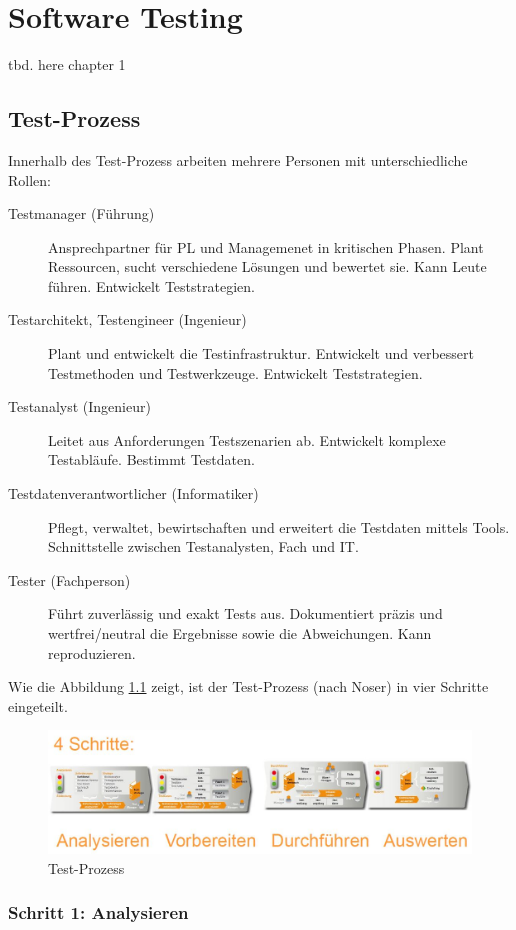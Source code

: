 \chapter{Software Testing}

tbd. here chapter 1

\section{Test-Prozess}

Innerhalb des Test-Prozess arbeiten mehrere Personen mit unterschiedliche Rollen:

\begin{description}
	\item[Testmanager (Führung)] Ansprechpartner für PL und Managemenet in kritischen Phasen. Plant Ressourcen, sucht verschiedene Lösungen und bewertet sie. Kann Leute führen. Entwickelt Teststrategien.
	\item[Testarchitekt, Testengineer (Ingenieur)] Plant und entwickelt die Testinfrastruktur. Entwickelt und verbessert Testmethoden und Testwerkzeuge. Entwickelt Teststrategien.
	\item[Testanalyst (Ingenieur)] Leitet aus Anforderungen Testszenarien ab. Entwickelt komplexe Testabläufe. Bestimmt Testdaten.
	\item[Testdatenverantwortlicher (Informatiker)] Pflegt, verwaltet, bewirtschaften und erweitert die Testdaten mittels Tools. Schnittstelle zwischen Testanalysten, Fach und IT. 
	\item[Tester (Fachperson)] Führt zuverlässig und exakt Tests aus. Dokumentiert präzis und wertfrei/neutral die Ergebnisse sowie die Abweichungen. Kann reproduzieren.
\end{description}

Wie die Abbildung \ref{fig:test-prozess} zeigt, ist der Test-Prozess (nach Noser) in vier Schritte eingeteilt.

\begin{figure}[h!]
\centering
\includegraphics[width=0.7\linewidth]{fig/test-prozess}
\caption{Test-Prozess}
\label{fig:test-prozess}
\end{figure}

\subsection{Schritt 1: Analysieren}

